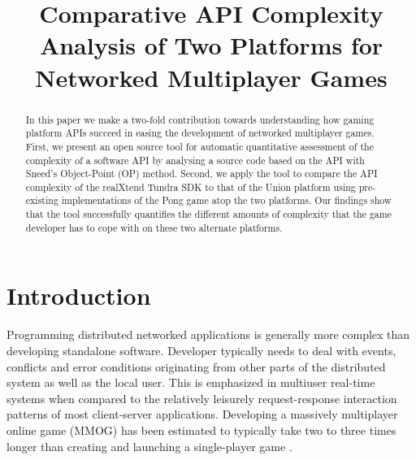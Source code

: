 \documentclass[conference]{IEEEtran}
\title{\phantomsection%
  Comparative API Complexity Analysis of Two Platforms for Networked Multiplayer Games%
  \label{comparative-api-complexity-analysis-of-two-platforms-for-networked-multiplayer-games}}
\author{}
\date{}
\begin{document}
\maketitle
\begin{abstract}
In this paper we make a two-fold contribution towards
understanding how gaming platform APIs succeed in easing
the development of networked multiplayer games. First, we
present an open source tool for automatic quantitative
assessment of the complexity of a software API by analysing
a source code based on the API with Sneed’s Object-Point
(OP) method. Second, we apply the tool to compare the API
complexity of the realXtend Tundra SDK to that of the Union
platform using pre-existing implementations of the Pong
game atop the two platforms. Our findings show that the
tool successfully quantifies the different amounts of
complexity that the game developer has to cope with on
these two alternate platforms.
\end{abstract}

\author{
\and
{}
\and
{}
}


\section{Introduction%
  \label{introduction}%
}

Programming distributed networked applications is generally more
complex than developing standalone software. Developer typically needs
to deal with events, conflicts and error conditions originating from
other parts of the distributed system as well as the local user. This
is emphasized in multiuser real-time systems when compared to the
relatively leisurely request-response interaction patterns of most
client-server applications. Developing a massively multiplayer online
game (MMOG) has been estimated to typically take two to three times
longer than creating and launching a single-player game \cite{middleware}.
\end{document}
